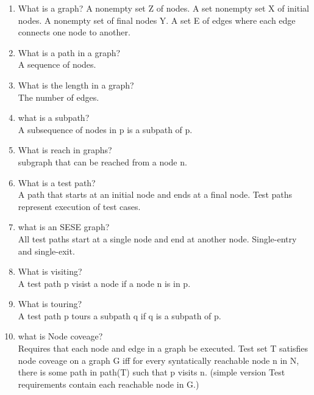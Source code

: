 \documentclass[10pt]{article}
\begin{document}
\begin{enumerate}
      \item What is a graph?
            A nonempty set Z of nodes. A set nonempty set X of initial nodes. A nonempty set of final nodes Y. A set E of edges where each edge connects one node to another.\\

      \item What is a path in a graph?\\
            A sequence of nodes.\\

      \item What is the length in a graph?
            \\ The number of edges.\\

      \item what is a subpath?\\
            A subsequence of nodes in p is a subpath of p.\\

      \item What is reach in graphs?\\
            subgraph that can be reached from a node n.\\

      \item What is a test path?
            \\ A path that starts at an initial node and ends at a final node. Test paths represent execution of test cases.\\

      \item what is an SESE graph?\\
            All test paths start at a single node and end at another node. Single-entry and single-exit.\\

      \item What is visiting?
            \\ A test path p visist a node if a node n is in p.\\
      \item What is touring?\\
            A test path p tours a subpath q if q is a subpath of p.\\

      \item what is Node coveage?\\
            Requires that each node and edge in a graph be executed.
            Test set T satisfies node coveage on a graph G iff for every syntatically reachable node n in N, there is some path in path(T) such that p visits n.
            (simple version Test requirements contain each reachable node in G.)\\


\end{enumerate}
\end{document}
